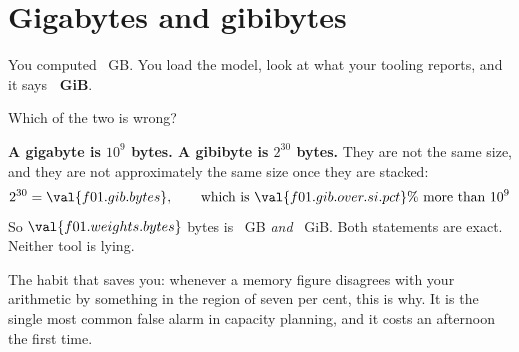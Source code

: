 \section{Gigabytes and gibibytes}
\label{sec:F01-prefixes}

\begin{fr}
You computed ~GB. You load the model, look at what your
tooling reports, and it says \textbf{~GiB}.

Which of the two is wrong?
\nextframe
\end{fr}

\begin{fr}
\begin{trapbox}
\textbf{A gigabyte is $10^{9}$ bytes. A gibibyte is $2^{30}$ bytes.} They are
not the same size, and they are not approximately the same size once they are
stacked:
\[ 2^{30} = \val{f01.gib.bytes}, \qquad
   \text{which is } \val{f01.gib.over.si.pct}\% \text{ more than } 10^{9} \]
So $\val{f01.weights.bytes}$ bytes is ~GB \emph{and}
~GiB. Both statements are exact. Neither tool is lying.

The habit that saves you: whenever a memory figure disagrees with your
arithmetic by something in the region of seven per cent, this is why. It is the
single most common false alarm in capacity planning, and it costs an afternoon
the first time.
\end{trapbox}
\end{fr}


